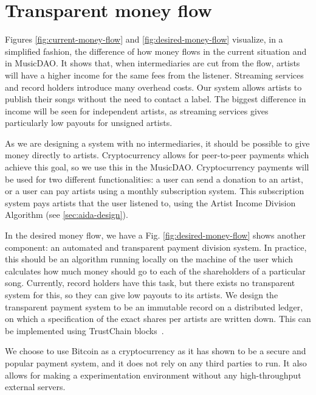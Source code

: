 

\section{Transparent money flow}
Figures \ref{fig:current-money-flow} and \ref{fig:desired-money-flow} visualize, in a simplified fashion, the difference of how money flows in the current situation and in MusicDAO. It shows that, when intermediaries are cut from the flow, artists will have a higher income for the same fees from the listener. Streaming services and record holders introduce many overhead costs. Our system allows artists to publish their songs without the need to contact a label. The biggest difference in income will be seen for independent artists, as streaming services gives particularly low payouts for unsigned artists.

As we are designing a system with no intermediaries, it should be possible to give money directly to artists. Cryptocurrency allows for peer-to-peer payments which achieve this goal, so we use this in the MusicDAO. Cryptocurrency payments will be used for two different functionalities: a user can send a donation to an artist, or a user can pay artists using a monthly subscription system. This subscription system pays artists that the user listened to, using the Artist Income Division Algorithm (see \ref{sec:aida-design}). 

In the desired money flow, we have a  Fig. \ref{fig:desired-money-flow} shows another component: an automated and transparent payment division system. In practice, this should be an algorithm running locally on the machine of the user which calculates how much money should go to each of the shareholders of a particular song. Currently, record holders have this task, but there exists no transparent system for this, so they can give low payouts to its artists. We design the transparent payment system to be an immutable record on a distributed ledger, on which a specification of the exact shares per artists are written down. This can be implemented using TrustChain blocks~\citep{otte2017trustchain}.

We choose to use Bitcoin as a cryptocurrency as it has shown to be a secure and popular payment system, and it does not rely on any third parties to run. It also allows for making a experimentation environment without any high-throughput external servers. 

